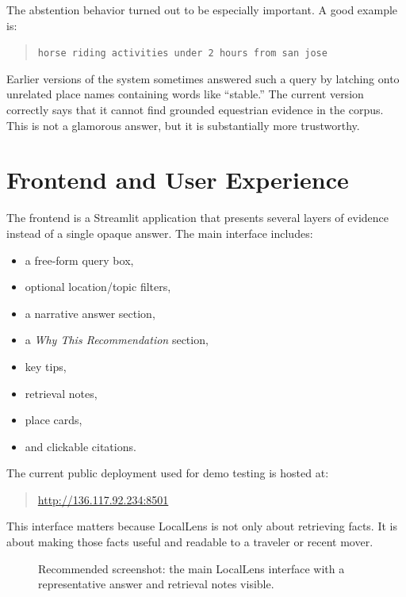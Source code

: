 \documentclass[11pt]{article}
\begin{document}
The abstention behavior turned out to be especially important. A good example is:
\begin{quote}
\texttt{horse riding activities under 2 hours from san jose}
\end{quote}
Earlier versions of the system sometimes answered such a query by latching onto unrelated place names containing words like ``stable.'' The current version correctly says that it cannot find grounded equestrian evidence in the corpus. This is not a glamorous answer, but it is substantially more trustworthy.

\section{Frontend and User Experience}
The frontend is a Streamlit application that presents several layers of evidence instead of a single opaque answer. The main interface includes:
\begin{itemize}[leftmargin=*]
    \item a free-form query box,
    \item optional location/topic filters,
    \item a narrative answer section,
    \item a \emph{Why This Recommendation} section,
    \item key tips,
    \item retrieval notes,
    \item place cards,
    \item and clickable citations.
\end{itemize}

The current public deployment used for demo testing is hosted at:
\begin{quote}
\url{http://136.117.92.234:8501}
\end{quote}

This interface matters because LocalLens is not only about retrieving facts. It is about making those facts useful and readable to a traveler or recent mover.

\begin{figure}[H]
\centering
{}
\caption{Recommended screenshot: the main LocalLens interface with a representative answer and retrieval notes visible.}
\label{fig:ui-main}
\end{figure}
\end{document}
